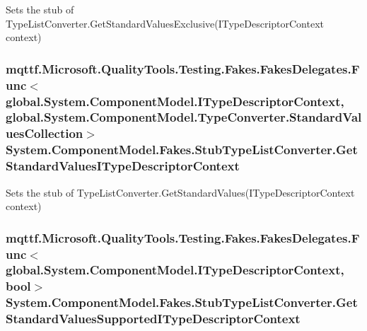 Sets the stub of Type\-List\-Converter.\-Get\-Standard\-Values\-Exclusive(\-I\-Type\-Descriptor\-Context context)

\hypertarget{class_system_1_1_component_model_1_1_fakes_1_1_stub_type_list_converter_ae06d28848570b52aa9ae53da4b3989d5}{
\subsubsection[{Get\-Standard\-Values\-I\-Type\-Descriptor\-Context}]{\setlength{\rightskip}{0pt plus 5cm}mqttf.\-Microsoft.\-Quality\-Tools.\-Testing.\-Fakes.\-Fakes\-Delegates.\-Func$<$global.\-System.\-Component\-Model.\-I\-Type\-Descriptor\-Context, global.\-System.\-Component\-Model.\-Type\-Converter.\-Standard\-Values\-Collection$>$ System.\-Component\-Model.\-Fakes.\-Stub\-Type\-List\-Converter.\-Get\-Standard\-Values\-I\-Type\-Descriptor\-Context}}\label{class_system_1_1_component_model_1_1_fakes_1_1_stub_type_list_converter_ae06d28848570b52aa9ae53da4b3989d5}


Sets the stub of Type\-List\-Converter.\-Get\-Standard\-Values(\-I\-Type\-Descriptor\-Context context)

\hypertarget{class_system_1_1_component_model_1_1_fakes_1_1_stub_type_list_converter_a5b01c418e44f58bcbfee06a3c1d50614}{
\subsubsection[{Get\-Standard\-Values\-Supported\-I\-Type\-Descriptor\-Context}]{\setlength{\rightskip}{0pt plus 5cm}mqttf.\-Microsoft.\-Quality\-Tools.\-Testing.\-Fakes.\-Fakes\-Delegates.\-Func$<$global.\-System.\-Component\-Model.\-I\-Type\-Descriptor\-Context, bool$>$ System.\-Component\-Model.\-Fakes.\-Stub\-Type\-List\-Converter.\-Get\-Standard\-Values\-Supported\-I\-Type\-Descriptor\-Context}}\label{class_system_1_1_component_model_1_1_fakes_1_1_stub_type_list_converter_a5b01c418e44f58bcbfee06a3c1d50614}


